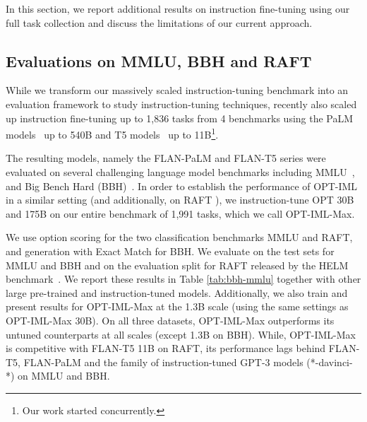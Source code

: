 In this section, we report additional results on instruction fine-tuning using our full task collection and discuss the limitations of our current approach.

\subsection{Evaluations on MMLU, BBH and RAFT}

While we transform our massively scaled instruction-tuning benchmark into an evaluation framework to study instruction-tuning techniques, recently \cite{chung2022flanpalm} also scaled up instruction fine-tuning up to 1,836 tasks from 4 benchmarks using the PaLM models~\citep{chowdhery2022palm} up to 540B and T5 models~\citep{raffel2020t5} up to 11B\footnote{Our work started concurrently.}.

The resulting models, namely the FLAN-PaLM and FLAN-T5 series were evaluated on several challenging language model benchmarks including MMLU~\citep{hendryckstest2021mmlu}, and Big Bench Hard (BBH)~\citep{srivastava2022beyond}. In order to establish the performance of OPT-IML in a similar setting (and additionally, on RAFT \citep{alex2021raft}), we instruction-tune OPT 30B and 175B on our entire benchmark of 1,991 tasks, which we call OPT-IML-Max.

We use option scoring for the two classification benchmarks MMLU and RAFT, and generation with Exact Match for BBH. We evaluate on the test sets for MMLU and BBH and on the evaluation split for RAFT released by the HELM benchmark~\citep{liang2022holistic}. We report these results in Table \ref{tab:bbh-mmlu} together with other large pre-trained and instruction-tuned models. Additionally, we also train and present results for OPT-IML-Max at the 1.3B scale (using the same settings as OPT-IML-Max 30B). On all three datasets,  OPT-IML-Max outperforms its untuned counterparts at all scales (except 1.3B on BBH). While, OPT-IML-Max is competitive with FLAN-T5 11B on RAFT, its performance lags behind FLAN-T5, FLAN-PaLM and the family of instruction-tuned GPT-3 models (*-davinci-*) on MMLU and BBH. 

